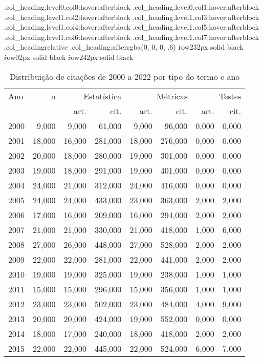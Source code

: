 \begin{table}
\caption{Distribuição de citações de 2000 a 2022 por tipo do termo e ano}
\th.col_heading.level0.col0:hover:afterblock
\th.col_heading.level0.col1:hover:afterblock
\th.col_heading.level1.col2:hover:afterblock
\th.col_heading.level1.col3:hover:afterblock
\th.col_heading.level1.col4:hover:afterblock
\th.col_heading.level1.col5:hover:afterblock
\th.col_heading.level1.col6:hover:afterblock
\th.col_heading.level1.col7:hover:afterblock
\th.col_headingrelative
\th.col_heading:afterrgba(0, 0, 0, .6)
\.row232px solid black
\.row02px solid black
\.row242px solid black
\begin{tabular}{lrrrrrrr}
Ano & n & \multicolumn{2}{r}{Estatística} & \multicolumn{2}{r}{Métricas} & \multicolumn{2}{r}{Testes} \\
 &  & art. & cit. & art. & cit. & art. & cit. \\
2000 & 9,000 & 9,000 & 61,000 & 9,000 & 96,000 & 0,000 & 0,000 \\
2001 & 18,000 & 16,000 & 281,000 & 18,000 & 276,000 & 0,000 & 0,000 \\
2002 & 20,000 & 18,000 & 280,000 & 19,000 & 301,000 & 0,000 & 0,000 \\
2003 & 19,000 & 18,000 & 291,000 & 19,000 & 401,000 & 0,000 & 0,000 \\
2004 & 24,000 & 21,000 & 312,000 & 24,000 & 416,000 & 0,000 & 0,000 \\
2005 & 24,000 & 24,000 & 433,000 & 23,000 & 363,000 & 2,000 & 2,000 \\
2006 & 17,000 & 16,000 & 209,000 & 16,000 & 294,000 & 2,000 & 2,000 \\
2007 & 21,000 & 21,000 & 330,000 & 21,000 & 418,000 & 1,000 & 6,000 \\
2008 & 27,000 & 26,000 & 448,000 & 27,000 & 528,000 & 2,000 & 2,000 \\
2009 & 22,000 & 22,000 & 281,000 & 22,000 & 441,000 & 2,000 & 2,000 \\
2010 & 19,000 & 19,000 & 325,000 & 19,000 & 238,000 & 1,000 & 1,000 \\
2011 & 15,000 & 15,000 & 296,000 & 15,000 & 356,000 & 1,000 & 1,000 \\
2012 & 23,000 & 23,000 & 502,000 & 23,000 & 484,000 & 4,000 & 9,000 \\
2013 & 20,000 & 20,000 & 424,000 & 19,000 & 552,000 & 0,000 & 0,000 \\
2014 & 18,000 & 17,000 & 240,000 & 18,000 & 418,000 & 2,000 & 2,000 \\
2015 & 22,000 & 22,000 & 445,000 & 22,000 & 524,000 & 6,000 & 7,000 \\

\end{tabular}
\end{table}
